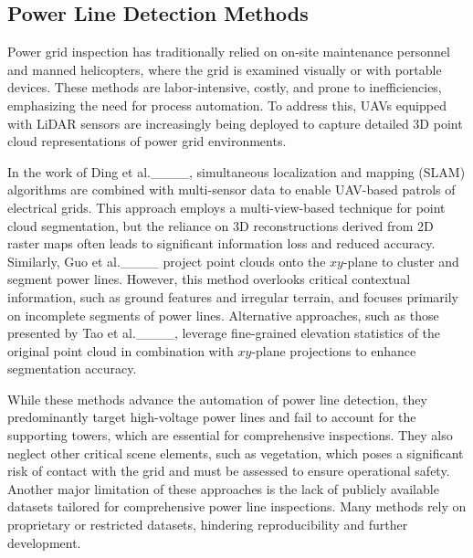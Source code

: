 \subsection{Power Line Detection Methods}

Power grid inspection has traditionally relied on on-site maintenance personnel and manned helicopters, where the grid is examined visually or with portable devices. These methods are labor-intensive, costly, and prone to inefficiencies, emphasizing the need for process automation. To address this, UAVs equipped with LiDAR sensors are increasingly being deployed to capture detailed 3D point cloud representations of power grid environments.

In the work of Ding et al.____, simultaneous localization and mapping (SLAM) algorithms are combined with multi-sensor data to enable UAV-based patrols of electrical grids. This approach employs a multi-view-based technique for point cloud segmentation, but the reliance on 3D reconstructions derived from 2D raster maps often leads to significant information loss and reduced accuracy. 
%
Similarly, Guo et al.____ project point clouds onto the $xy$-plane to cluster and segment power lines. However, this method overlooks critical contextual information, such as ground features and irregular terrain, and focuses primarily on incomplete segments of power lines. Alternative approaches, such as those presented by Tao et al.____, leverage fine-grained elevation statistics of the original point cloud in combination with $xy$-plane projections to enhance segmentation accuracy.

While these methods advance the automation of power line detection, they predominantly target high-voltage power lines and fail to account for the supporting towers, which are essential for comprehensive inspections. 
%
They also neglect other critical scene elements, such as vegetation, which poses a significant risk of contact with the grid and must be assessed to ensure operational safety.
%
Another major limitation of these approaches is the lack of publicly available datasets tailored for comprehensive power line inspections. Many methods rely on proprietary or restricted datasets, hindering reproducibility and further development.